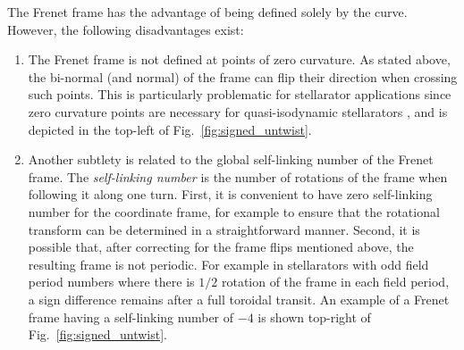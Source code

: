\documentclass[12pt]{iopart}
\newcommand\hladdedrev[1]{#1} %
\newcommand\hlchangedrev[1]{#1} %
\newcommand\linknum[1]{\hlchangedrev{self-linking number{#1}}}
\newcommand\binormal[1]{bi-normal{#1}}
\begin{document}
The Frenet frame has the advantage of being defined solely by the curve. However, the following disadvantages exist: 
\begin{enumerate}
    \item The Frenet frame is not defined at points of zero curvature. As stated above, the 
    \hlchangedrev{\binormal{ } (and normal) of the frame can flip their direction when crossing such points. This is particularly problematic for stellarator applications since zero curvature points are necessary for quasi-isodynamic
stellarators \cite{plunk_landreman_helander_2019}, and is depicted in the top-left of Fig.~\ref{fig:signed_untwist}.}
    \item Another subtlety is related to the global \linknum{ } of the Frenet frame. The \emph{\linknum{ }} is  the number of rotations of the frame when following it along one turn. First, it is convenient to have zero \linknum{ } for the coordinate frame, for example to ensure that the rotational transform can be determined in a straightforward manner.   \hlchangedrev{Second, it is possible that, after correcting for the frame flips mentioned above, the resulting frame is not periodic.  For example in stellarators with odd field period numbers where there is $1/2$  rotation of the frame in each field period, a sign difference remains after a full toroidal transit.}  An example of a Frenet frame having a \linknum{ } of $-4$ is shown top-right of Fig.~\ref{fig:signed_untwist}.
\end{enumerate}
 
\end{document}

